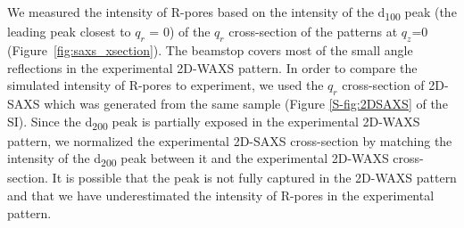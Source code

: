 \documentclass[journal=jpcbfk,manuscript=article]{achemso}
\begin{document}
  We measured the intensity of R-pores based on the intensity of the
  d\textsubscript{100} peak (the leading peak closest to $q_r$ = 0) of the $q_r$
  cross-section of the patterns at $q_z$=0 (Figure~\ref{fig:saxs_xsection}). The
  beamstop covers most of the small angle reflections in the experimental 2D-WAXS
  pattern. In order to compare the simulated intensity of R-pores to experiment,
  we used the $q_r$ cross-section of 2D-SAXS which was generated from the same
  sample (Figure \ref{S-fig:2DSAXS} of the SI). Since the d\textsubscript{200} peak is
  partially exposed in the experimental 2D-WAXS pattern, we normalized the
  experimental 2D-SAXS cross-section by matching the intensity of the
  d\textsubscript{200} peak between it and the experimental 2D-WAXS
  cross-section. It is possible that the peak is not fully captured in the 2D-WAXS
  pattern and that we have underestimated the intensity of R-pores in the
  experimental pattern.     
\end{document}
